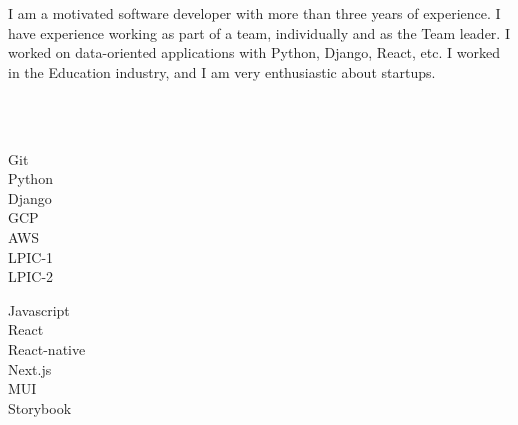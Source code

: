 \documentclass[9pt]{developercv}
\begin{document}
\begin{minipage}[t]{1\textwidth}
	\vspace{-\baselineskip}
	I am a motivated software developer with more than three years of experience.
	I have experience working as part of a team, individually and as the Team leader.
	I worked on data-oriented applications with Python, Django, React, etc.
	I worked in the Education industry, and I am very enthusiastic about startups.
\end{minipage}

\\\\
\begin{minipage}[t]{0.49\textwidth}
	\Large
	\vspace{-\baselineskip}

	\faCircle \; {Git}\\
	\faCircle \; {Python}\\
	\faCircle \; {Django}\\
	\faCircle \; {GCP}\\
	\faCircle \; {AWS}\\
	\faCircle \; {LPIC-1}\\
	\faCircle \; {LPIC-2}\\
\end{minipage}
\begin{minipage}[t]{0.50\textwidth}
	\Large
	\vspace{-\baselineskip}

	\faCircle \; {Javascript}\\
	\faCircle \; {React}\\
	\faCircle \; {React-native}\\
	\faCircle \; {Next.js}\\
	\faCircle \; {MUI}\\
	\faCircle \; {Storybook}\\
\end{minipage}
\end{document}
